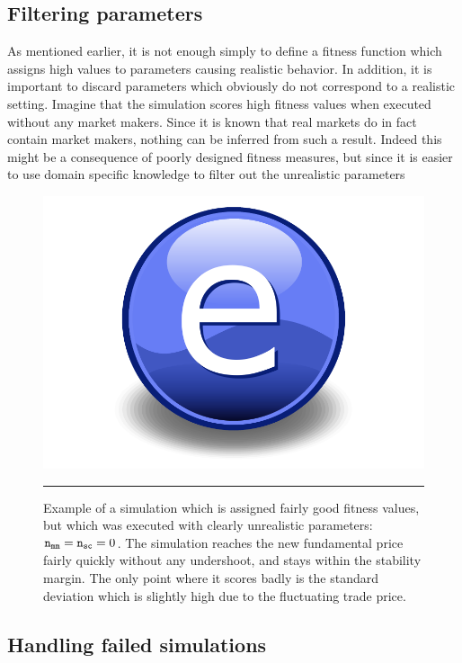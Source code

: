 \subsection{Filtering parameters}\label{section:filtering_parameters}
As mentioned earlier, it is not enough simply to define a fitness function which assigns high values to parameters causing realistic behavior. In addition, it is important to discard parameters which obviously do not correspond to a realistic setting. Imagine that the simulation scores high fitness values when executed without any market makers. Since it is known that real markets do in fact contain market makers, nothing can be inferred from such a result. Indeed this might be a consequence of poorly designed fitness measures, but since it is easier to use domain specific knowledge to filter out the unrealistic parameters

\begin{figure}[htbp]
	\centering
		\includegraphics{Figures/Electron.pdf}
		\rule{35em}{0.5pt}
	\caption{Example of a simulation which is assigned fairly good fitness values, but which was executed with clearly unrealistic parameters: $ \texttt{n}_\texttt{mm}  =  \texttt{n}_\texttt{sc}  = 0$. The simulation reaches the new fundamental price fairly quickly without any undershoot, and stays within the stability margin. The only point where it scores badly is the standard deviation which is slightly high due to the fluctuating trade price.}
	\label{fig:no_marketmakers}
\end{figure}


\subsection{Handling failed simulations}\label{section:failed_simulations}


